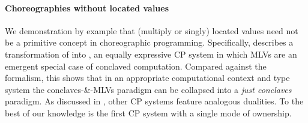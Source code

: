 \paragraph{Choreographies without located values}
We demonstration by example that (multiply or singly) located values need not be a primitive concept in choreographic programming.
Specifically,  describes a transformation of \MultiChor into \minichor,
an equally expressive CP system in which MLVs are an emergent special case of conclaved computation.
Compared against the \HLSCentral formalism, this shows that in an appropriate computational context and type system the conclaves-\&-MLVs paradigm
can be collapsed into a \emph{just conclaves} paradigm.
As discussed in , other CP systems feature analogous dualities.
To the best of our knowledge \minichor is the first CP system with a single mode of ownership.

